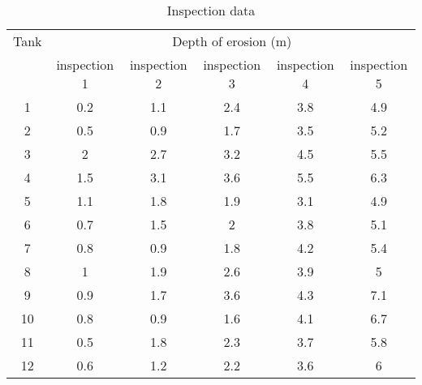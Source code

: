 \begin{table}
	\caption{Inspection data} \label{tbl:35}
\begin{tabular}{|l|l|l|l|l|l|}
\hline
\multicolumn{1}{|c|}{Tank} & \multicolumn{5}{c|}{Depth of erosion (m)} \\ 
\cline{2-6}
\multicolumn{1}{|c|}{} & \multicolumn{1}{c|}{inspection 1} & \multicolumn{1}{c|}{inspection 2} & \multicolumn{1}{c|}{inspection 3} & \multicolumn{1}{c|}{inspection 4} & \multicolumn{1}{c|}{inspection 5} \\ 
\hline
\multicolumn{1}{|c|}{1} & \multicolumn{1}{c|}{0.2} & \multicolumn{1}{c|}{1.1} & \multicolumn{1}{c|}{2.4} & \multicolumn{1}{c|}{3.8} & \multicolumn{1}{c|}{4.9} \\ 
\hline
\multicolumn{1}{|c|}{2} & \multicolumn{1}{c|}{0.5} & \multicolumn{1}{c|}{0.9} & \multicolumn{1}{c|}{1.7} & \multicolumn{1}{c|}{3.5} & \multicolumn{1}{c|}{5.2} \\ 
\hline
\multicolumn{1}{|c|}{3} & \multicolumn{1}{c|}{2} & \multicolumn{1}{c|}{2.7} & \multicolumn{1}{c|}{3.2} & \multicolumn{1}{c|}{4.5} & \multicolumn{1}{c|}{5.5} \\ 
\hline
\multicolumn{1}{|c|}{4} & \multicolumn{1}{c|}{1.5} & \multicolumn{1}{c|}{3.1} & \multicolumn{1}{c|}{3.6} & \multicolumn{1}{c|}{5.5} & \multicolumn{1}{c|}{6.3} \\ 
\hline
\multicolumn{1}{|c|}{5} & \multicolumn{1}{c|}{1.1} & \multicolumn{1}{c|}{1.8} & \multicolumn{1}{c|}{1.9} & \multicolumn{1}{c|}{3.1} & \multicolumn{1}{c|}{4.9} \\ 
\hline
\multicolumn{1}{|c|}{6} & \multicolumn{1}{c|}{0.7} & \multicolumn{1}{c|}{1.5} & \multicolumn{1}{c|}{2} & \multicolumn{1}{c|}{3.8} & \multicolumn{1}{c|}{5.1} \\ 
\hline
\multicolumn{1}{|c|}{7} & \multicolumn{1}{c|}{0.8} & \multicolumn{1}{c|}{0.9} & \multicolumn{1}{c|}{1.8} & \multicolumn{1}{c|}{4.2} & \multicolumn{1}{c|}{5.4} \\ 
\hline
\multicolumn{1}{|c|}{8} & \multicolumn{1}{c|}{1} & \multicolumn{1}{c|}{1.9} & \multicolumn{1}{c|}{2.6} & \multicolumn{1}{c|}{3.9} & \multicolumn{1}{c|}{5} \\ 
\hline
\multicolumn{1}{|c|}{9} & \multicolumn{1}{c|}{0.9} & \multicolumn{1}{c|}{1.7} & \multicolumn{1}{c|}{3.6} & \multicolumn{1}{c|}{4.3} & \multicolumn{1}{c|}{7.1} \\ 
\hline
\multicolumn{1}{|c|}{10} & \multicolumn{1}{c|}{0.8} & \multicolumn{1}{c|}{0.9} & \multicolumn{1}{c|}{1.6} & \multicolumn{1}{c|}{4.1} & \multicolumn{1}{c|}{6.7} \\ 
\hline
\multicolumn{1}{|c|}{11} & \multicolumn{1}{c|}{0.5} & \multicolumn{1}{c|}{1.8} & \multicolumn{1}{c|}{2.3} & \multicolumn{1}{c|}{3.7} & \multicolumn{1}{c|}{5.8} \\ 
\hline
\multicolumn{1}{|c|}{12} & \multicolumn{1}{c|}{0.6} & \multicolumn{1}{c|}{1.2} & \multicolumn{1}{c|}{2.2} & \multicolumn{1}{c|}{3.6} & \multicolumn{1}{c|}{6} \\ 
\hline
\end{tabular}
\end{table}


